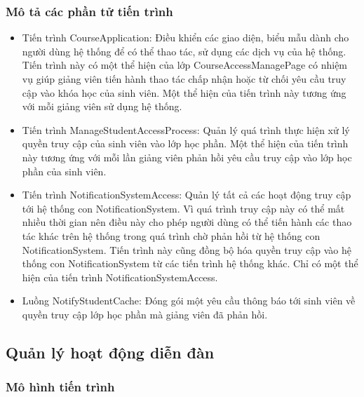 \documentclass[./../main_file.tex]{subfiles}
\begin{document}
\subsubsection{Mô tả các phần tử tiến trình}
\begin{itemize}
	\item Tiến trình CourseApplication: Điều khiển các giao diện, biểu mẫu dành cho người dùng hệ thống để có thể thao tác, sử dụng các dịch vụ của hệ thống. Tiến trình này có một thể hiện của lớp CourseAccessManagePage có nhiệm vụ giúp giảng viên tiến hành thao tác chấp nhận hoặc từ chối yêu cầu truy cập vào khóa học của sinh viên.
	Một thể hiện của tiến trình này tương ứng với mỗi giảng viên sử dụng hệ thống.
	\item Tiến trình ManageStudentAccessProcess: Quản lý quá trình thực hiện xử lý quyền truy cập của sinh viên vào lớp học phần.
	Một thể hiện của tiến trình này tương ứng với mỗi lần giảng viên phản hồi yêu cầu truy cập vào lớp học phần của sinh viên.
	\item Tiến trình NotificationSystemAccess: Quản lý tất cả các hoạt động truy cập tới hệ thống con NotificationSystem. Vì quá trình truy cập này có thể mất nhiều thời gian nên điều này cho phép người dùng có thể tiến hành các thao tác khác trên hệ thống trong quá trình chờ phản hồi từ hệ thống con NotificationSystem. Tiến trình này cũng đồng bộ hóa quyền truy cập vào hệ thống con NotificationSystem từ các tiến trình hệ thống khác.
	Chỉ có một thể hiện của tiến trình NotificationSystemAccess.
	\item Luồng NotifyStudentCache: Đóng gói một yêu cầu thông báo tới sinh viên về quyền truy cập lớp học phần mà giảng viên đã phản hồi.
\end{itemize}

\subsection{Quản lý hoạt động diễn đàn}

\subsubsection{Mô hình tiến trình}
\end{document}
